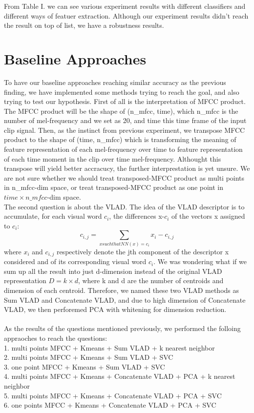 \documentclass[final]{siamltexmm}
\begin{document}
From Table I. we can see various experiment results with different classifiers and different ways of featuer extraction.  Although our experiment results didn't reach the result on top of list, we have a robustness results.

\section{Baseline Approaches}
To have our baseline approaches reaching similar accuracy as the previous finding, we have implemented some methods trying to reach the goal, and also trying to test our hypothesis. First of all is the interpretation of MFCC product. The MFCC product will be the shape of (n\_mfcc, time), which n\_mfcc is the number of mel-frequency and we set as 20, and time this time frame of the input clip signal. Then, as the instinct from previous experiment, we transpose MFCC product to the shape of (time, n\_mfcc) which is transforming the meaning of feature representation of each mel-frequency over time to feature representation of each time moment in the clip over time mel-frequency. Althought this transpose will yield better accracucy, the further interprestation is yet unsure. We are not sure whether we should treat transposed-MFCC product as multi points in n\_mfcc-dim space, or treat transposed-MFCC product as one point in $time \times n\_mfcc$-dim space.
\\The second question is about the VLAD. The idea of the VLAD descriptor is to accumulate, for each visual word $c_{i}$, the differences x-$c_{i}$ of the vectors x assigned to $c_{i}$:
\begin{equation}
c_{i, j} = \sum\limits_{x such that NN(x)=c_{i}} x_{i}-c_{i,j}
\end{equation}
where $x_{i}$ and $c_{i,j}$ respectively denote the jth component of the descriptor x considered and of its corresponding visual word $c_{i}$. We was wondering what if we sum up all the result into just d-dimension instead of the original VLAD representation $D=k\times d$, where k and d are the number of centroids and dimension of each centroid. Therefore, we named these two VLAD methods as Sum VLAD and Concatenate VLAD, and due to high dimension of Concatenate VLAD, we then perforemed PCA with whitening for dimension reduction.
\\\\As the results of the questions mentioned previously, we performed the folloing appraoches to reach the questions:
\\ 1. multi points MFCC + Kmeans + Sum VLAD + k nearest neighbor
\\ 2. multi points MFCC + Kmeans + Sum VLAD + SVC
\\ 3. one point MFCC + Kmeans + Sum VLAD + SVC
\\ 4. multi points MFCC + Kmeans + Concatenate VLAD + PCA + k nearest neighbor
\\ 5. multi points MFCC + Kmeans + Concatenate VLAD + PCA + SVC
\\ 6. one points MFCC + Kmeans + Concatenate VLAD + PCA + SVC
\end{document}
